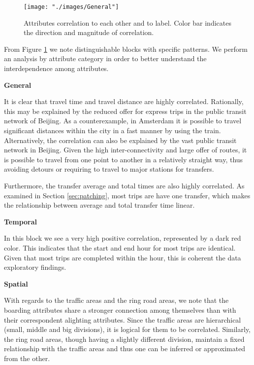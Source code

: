 \documentclass{article}
\begin{document}
\begin{figure}[H]
  \centering
  \texttt{[image: "./images/General"]}
  \caption{Attributes correlation to each other and to label. Color bar indicates the direction and magnitude of correlation.}
  \label{fig:classification/correlation}
\end{figure}

From Figure \ref{fig:classification/correlation} we note distinguishable blocks with specific patterns. We perform an analysis by attribute category in order to better understand the interdependence among attributes.

\textbf{General} 

It is clear that travel time and travel distance are highly correlated. Rationally, this may be explained by the reduced offer for express trips in the public transit network of Beijing. As a counterexample, in Amsterdam it is possible to travel significant distances within the city in a fast manner by using the train. Alternatively, the correlation can also be explained by the vast public transit network in Beijing. Given the high inter-connectivity and large offer of routes, it is possible to travel from one point to another in a relatively straight way, thus avoiding detours or requiring to travel to major stations for transfers. 
 
Furthermore, the transfer average and total times are also highly correlated. As examined in Section \ref{sec:patching}, most trips are have one transfer, which makes the relationship between average and total transfer time linear.

\textbf{Temporal}

In this block we see a very high positive correlation, represented by a dark red color. This indicates that the start and end hour for most trips are identical. Given that most trips are completed within the hour, this is coherent the data exploratory findings. 

\textbf{Spatial}

With regards to the traffic areas and the ring road areas, we note that the boarding attributes share a stronger connection among themselves than with their correspondent alighting attributes. Since the traffic areas are hierarchical (small, middle and big divisions), it is logical for them to be correlated. Similarly, the ring road areas, though having a slightly different division, maintain a fixed relationship with the traffic areas and thus one can be inferred or approximated from the other. 
\end{document}
